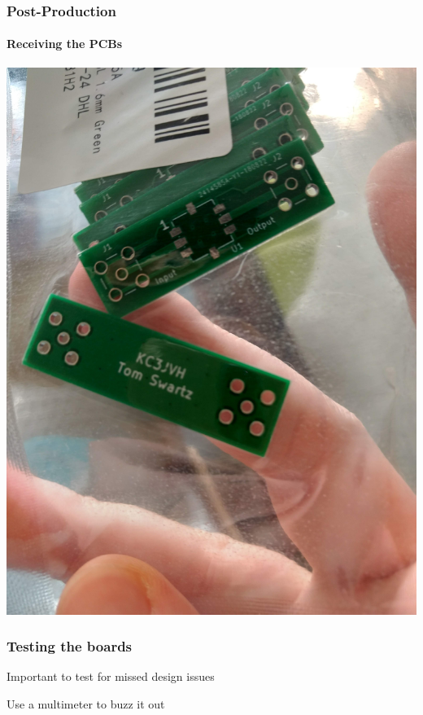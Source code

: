 \documentclass[]{beamer}
\begin{document}
\begin{frame}
    \frametitle{Post-Production}
    \framesubtitle{Receiving the PCBs}
    \begin{center}
        \includegraphics[height=0.70\paperheight,keepaspectratio]{images/packaging.jpg}
    \end{center}
\end{frame}
\begin{frame}
    \frametitle{Testing the boards}
    Important to test for missed design issues

    Use a multimeter to buzz it out
\end{frame}
\end{document}
